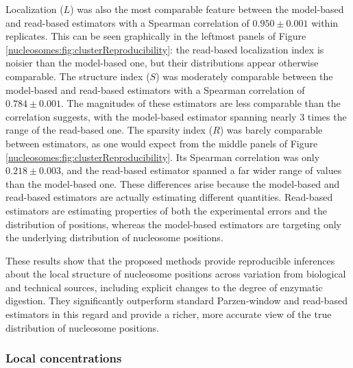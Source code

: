 Localization ($L$) was also the most comparable feature between the model-based and read-based estimators with a Spearman correlation of $0.950\pm0.001$ within replicates.
%
This can be seen graphically in the leftmost panels of Figure \ref{nucleosomes:fig:clusterReproducibility}: the read-based localization index is noisier than the model-based one, but their distributions appear otherwise comparable.
%
The structure index ($S$) was moderately comparable between the model-based and read-based estimators with a Spearman correlation of $0.784\pm0.001$.
The magnitudes of these estimators are less comparable than the correlation suggests, with the model-based estimator spanning nearly 3 times the range of the read-based one.
%
The sparsity index ($R$) was barely comparable between estimators, as one would expect from the middle panels of Figure \ref{nucleosomes:fig:clusterReproducibility}.
Its Spearman correlation was only $0.218\pm0.003$, and the read-based estimator spanned a far wider range of values than the model-based one.
%
These differences arise because the model-based and read-based estimators are actually estimating different quantities.
Read-based estimators are estimating properties of both the experimental errors and the distribution of positions, whereas the model-based estimators are targeting only the underlying distribution of nucleosome positions.

These results show that the proposed methods provide reproducible inferences about the local structure of nucleosome positions across variation from biological and technical sources, including explicit changes to the degree of enzymatic digestion.
They significantly outperform standard Parzen-window and read-based estimators in this regard and provide a richer, more accurate view of the true distribution of nucleosome positions.

\subsubsection{Local concentrations}
\label{nucleosomes:sec:detectionReproducibility}

